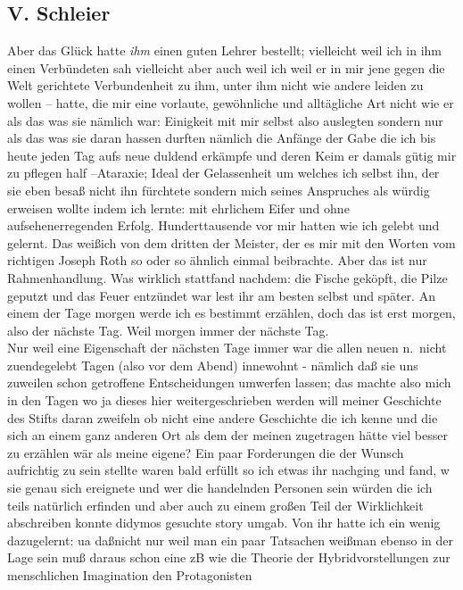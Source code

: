 \documentclass[
]{article}
\author{}
\date{\vspace{-2.5em}}
\begin{document}
\subsection{V. Schleier}\label{v.-schleier}

Aber das Glück hatte \emph{ihm} einen guten Lehrer bestellt; vielleicht
weil ich in ihm einen Verbündeten sah vielleicht aber auch weil ich weil
er in mir jene gegen die Welt gerichtete Verbundenheit zu ihm, unter ihm
nicht wie andere leiden zu wollen -- hatte, die mir eine vorlaute,
gewöhnliche und alltägliche Art nicht wie er als das was sie nämlich
war: Einigkeit mit mir selbst also auslegten sondern nur als das was sie
daran hassen durften nämlich die Anfänge der Gabe die ich bis heute
jeden Tag aufs neue duldend erkämpfe und deren Keim er damals gütig mir
zu pflegen half --Ataraxie; Ideal der Gelassenheit um welches ich selbst
ihn, der sie eben besaß nicht ihn fürchtete sondern mich seines
Anspruches als würdig erweisen wollte indem ich lernte: mit ehrlichem
Eifer und ohne aufsehenerregenden Erfolg. Hunderttausende vor mir hatten
wie ich gelebt und gelernt. Das weißich von dem dritten der Meister, der
es mir mit den Worten vom richtigen Joseph Roth so oder so ähnlich
einmal beibrachte. Aber das ist nur Rahmenhandlung. Was wirklich
stattfand nachdem: die Fische geköpft, die Pilze geputzt und das Feuer
entzündet war lest ihr am besten selbst und später. An einem der Tage
morgen werde ich es bestimmt erzählen, doch das ist erst morgen, also
der nächste Tag. Weil morgen immer der nächste Tag.\\
Nur weil eine Eigenschaft der nächsten Tage immer war die allen neuen
n.~nicht zuendegelebt Tagen (also vor dem Abend) innewohnt - nämlich daß
sie uns zuweilen schon getroffene Entscheidungen umwerfen lassen; das
machte also mich in den Tagen wo ja dieses hier weitergeschrieben werden
will meiner Geschichte des Stifts daran zweifeln ob nicht eine andere
Geschichte die ich kenne und die sich an einem ganz anderen Ort als dem
der meinen zugetragen hätte viel besser zu erzählen wär als meine
eigene? Ein paar Forderungen die der Wunsch aufrichtig zu sein stellte
waren bald erfüllt so ich etwas ihr nachging und fand, w sie genau sich
ereignete und wer die handelnden Personen sein würden die ich teils
natürlich erfinden und aber auch zu einem großen Teil der Wirklichkeit
abschreiben konnte didymos gesuchte story umgab. Von ihr hatte ich ein
wenig dazugelernt: ua daßnicht nur weil man ein paar Tatsachen weißman
ebenso in der Lage sein muß daraus schon eine zB wie die Theorie der
Hybridvorstellungen zur menschlichen Imagination den Protagonisten
\end{document}
